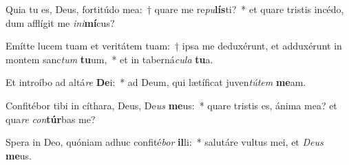 \item Quia tu es, Deus, fortitúdo mea:~† quare me re\textit{pu}\textbf{lís}ti?~* et quare tristis incédo, dum afflígit me \textit{in}\textit{i}\textbf{mí}cus?
\item Emítte lucem tuam et veritátem tuam:~† ipsa me deduxérunt, et adduxérunt in montem sanc\textit{tum} \textbf{tu}um,~* et in taberná\textit{cu}\textit{la} \textbf{tu}a.
\item Et introíbo ad altá\textit{re} \textbf{De}i:~* ad Deum, qui lætíficat juven\textit{tú}\textit{tem} \textbf{me}am.
\item Confitébor tibi in cíthara, Deus, De\textit{us} \textbf{me}us:~* quare tristis es, ánima mea? et qua\textit{re} \textit{con}\textbf{túr}bas me?
\item Spera in Deo, quóniam adhuc confité\textit{bor} \textbf{il}li:~* salutáre vultus mei, et \textit{De}\textit{us} \textbf{me}us.
